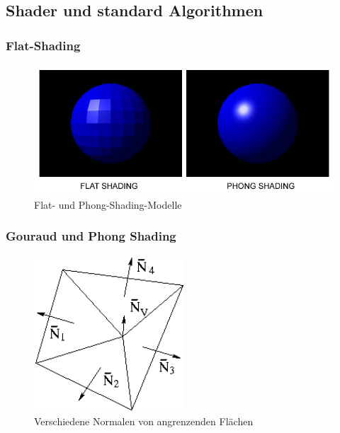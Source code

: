 \subsection{Shader und standard Algorithmen}

\subsubsection{Flat-Shading}
\begin{figure}[H]
    \centering
    \includegraphics[width=1.0\textwidth]{images/phong_flat_shading.jpg}
    \caption{Flat- und Phong-Shading-Modelle}
    \label{fig:shading-flat-phong-models}
\end{figure}


\subsubsection{Gouraud und Phong Shading}
\begin{figure}[H]
    \centering
    \includegraphics[width=0.5\textwidth]{images/gouraud_normals.png}
    \caption{Verschiedene Normalen von angrenzenden Flächen}
    \label{fig:gouraud-shading-scanline}
\end{figure}


